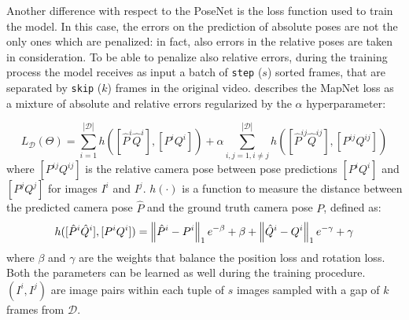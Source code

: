 Another difference with respect to the PoseNet is the loss function used to train the model. In this case, the errors on the prediction of absolute poses are not the only ones which are penalized: in fact, also errors in the relative poses are taken in consideration. To be able to penalize also relative errors, during the training process the model receives as input a batch of \texttt{step} ($s$) sorted frames, that are separated by \texttt{skip} ($k$) frames in the original video.
 describes the MapNet loss as a mixture of absolute and relative errors regularized by the $\alpha$ hyperparameter: 

\small
\begin{equation}
    L_\mathcal{D}(\Theta) = \sum\limits_{i=1}^{|\mathcal{D}|} h([\hat{P}^i \hat{Q}^i], [P^i Q^i]) + \alpha\sum\limits_{i,j=1, i\neq j}^{|\mathcal{D}|} h([\hat{P}^{ij} \hat{Q}^{ij}], [P^{ij} Q^{ij}])
    \label{eq:mapnet-loss}
\end{equation}
\normalsize
where $[P^{ij} Q^{ij}]$ is the relative camera pose between pose predictions $[P^i Q^i]$ and $[P^j Q^j]$ for images $I^i$ and $I^j$.
$h(\cdot)$ is a function to measure the distance between the predicted camera pose $\hat{P}$ and the ground truth camera pose $P$, defined as:
\small
\begin{equation}
    h([\hat{P}^i \hat{Q}^i], [P^i Q^i]) = \norm{\hat{P}^i-P^i}_1 e^{-\beta} + \beta + \norm{\hat{Q}^i-Q^i}_1 e^{-\gamma} + \gamma
    \label{eq:mapnet-loss-h}
\end{equation}
\normalsize
where $\beta$ and $\gamma$ are the weights that balance the position loss and rotation loss. Both the parameters can be learned as well during the training procedure. $(I^i, I^j)$ are image pairs within each tuple of $s$ images sampled with a gap of $k$ frames from $\mathcal{D}$.

